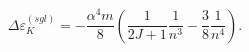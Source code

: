 \begin{equation}
\Delta \varepsilon _{K}^{(sgl)}=-\frac{\alpha ^{4}m}{8}\left( \frac{1}{2J+1}%
\frac{1}{n^{3}}-\frac{3}{8}\frac{1}{n^{4}}\right) .
\end{equation}


